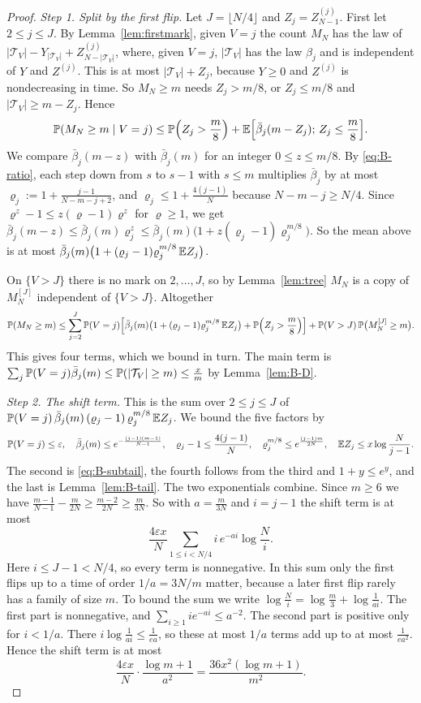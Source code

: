 \begin{proof}
\emph{Step 1. Split by the first flip.} Let $J=\lfloor N/4\rfloor$ and
$Z_j=Z^{(j)}_{N-1}$. First let $2\le j\le J$. By Lemma~\ref{lem:firstmark},
given $V=j$ the count $M_N$ has the law of
$\lvert\mathcal T_V\rvert-Y_{\lvert\mathcal T_V\rvert}+Z^{(j)}_{N-\lvert\mathcal T_V\rvert}$, where,
given $V=j$, $\lvert\mathcal T_V\rvert$ has the law $\beta_j$ and is independent of $Y$ and
$Z^{(j)}$. This is at most $\lvert\mathcal T_V\rvert+Z_j$, because $Y\ge0$ and $Z^{(j)}$ is
nondecreasing in time. So $M_N\ge m$ needs $Z_j>m/8$, or $Z_j\le m/8$ and
$\lvert\mathcal T_V\rvert\ge m-Z_j$. Hence
\[
 \mathbb{P}(M_N\ge m\mid V=j)\le\mathbb{P}\Bigl(Z_j>\frac m8\Bigr)
 +\mathbb{E}\Bigl[\bar\beta_j(m-Z_j);\,Z_j\le\frac m8\Bigr].
\]
We compare $\bar\beta_j(m-z)$ with $\bar\beta_j(m)$ for an integer
$0\le z\le m/8$. By \eqref{eq:B-ratio}, each step down from $s$ to $s-1$
with $s\le m$ multiplies $\bar\beta_j$ by at most
$\varrho_j:=1+\frac{j-1}{N-m-j+2}$, and $\varrho_j\le1+\frac{4(j-1)}N$
because $N-m-j\ge N/4$. Since $\varrho^z-1\le z(\varrho-1)\varrho^z$ for
$\varrho\ge1$, we get
$\bar\beta_j(m-z)\le\bar\beta_j(m)\varrho_j^z\le\bar\beta_j(m)\bigl(1+z(\varrho_j-1)\varrho_j^{m/8}\bigr)$.
So the mean above is at most
$\bar\beta_j(m)\bigl(1+(\varrho_j-1)\varrho_j^{m/8}\,\mathbb{E} Z_j\bigr)$.

On $\{V>J\}$ there is no mark on $2,\dots,J$, so by Lemma~\ref{lem:tree}
$M_N$ is a copy of $M^{[J]}_N$ independent of $\{V>J\}$. Altogether
\[
 \mathbb{P}(M_N\ge m)\le\sum_{j=2}^J\mathbb{P}(V=j)\Bigl[\bar\beta_j(m)\bigl(1+(\varrho_j-1)\varrho_j^{m/8}\,\mathbb{E} Z_j\bigr)+\mathbb{P}\Bigl(Z_j>\frac m8\Bigr)\Bigr]
 +\mathbb{P}(V>J)\,\mathbb{P}\bigl(M^{[J]}_N\ge m\bigr).
\]
This gives four terms, which we bound in turn. The main term is
$\sum_j\mathbb{P}(V=j)\bar\beta_j(m)\le\mathbb{P}(\lvert\mathcal T_V\rvert\ge m)\le\frac xm$ by
Lemma~\ref{lem:B-D}.

\emph{Step 2. The shift term.} This is the sum over $2\le j\le J$ of
$\mathbb{P}(V=j)\,\bar\beta_j(m)\,(\varrho_j-1)\,\varrho_j^{m/8}\,\mathbb{E} Z_j$. We
bound the five factors by
\[
 \mathbb{P}(V=j)\le\varepsilon,\quad
 \bar\beta_j(m)\le e^{-\frac{(j-1)(m-1)}{N-1}},\quad
 \varrho_j-1\le\frac{4(j-1)}N,\quad
 \varrho_j^{m/8}\le e^{\frac{(j-1)m}{2N}},\quad
 \mathbb{E} Z_j\le x\log\frac N{j-1}.
\]
The second is \eqref{eq:B-subtail}, the fourth follows from the third and
$1+y\le e^y$, and the last is Lemma~\ref{lem:B-tail}. The two exponentials
combine. Since $m\ge6$ we have
$\frac{m-1}{N-1}-\frac m{2N}\ge\frac{m-2}{2N}\ge\frac m{3N}$. So with
$a=\frac m{3N}$ and $i=j-1$ the shift term is at most
\[
 \frac{4\varepsilon x}N\sum_{1\le i<N/4}i\,e^{-ai}\log\frac Ni .
\]
Here $i\le J-1<N/4$, so every term is nonnegative. In this sum only the first flips up to a time of order $1/a=3N/m$ matter,
because a later first flip rarely has a family of size $m$. To bound the
sum we write $\log\frac Ni=\log\frac m3+\log\frac1{ai}$. The first part is
nonnegative, and $\sum_{i\ge1}ie^{-ai}\le a^{-2}$. The second part is
positive only for $i<1/a$. There $i\log\frac1{ai}\le\frac1{ea}$, so these
at most $1/a$ terms add up to at most $\frac1{ea^2}$. Hence the shift term
is at most
\[
 \frac{4\varepsilon x}N\cdot\frac{\log m+1}{a^2}=\frac{36x^2(\log m+1)}{m^2} .
\]


\end{proof}
